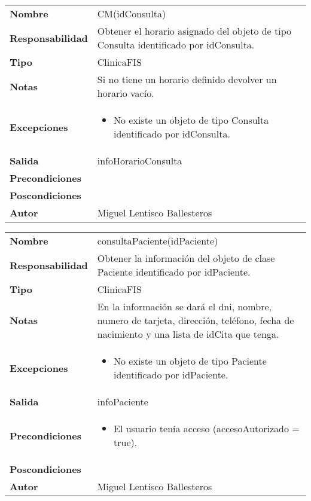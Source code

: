 \documentclass[11pt,a4paper]{article}
\newenvironment{itemizenomargins}
    {\begin{minipage}[t]{1\linewidth}\begin{itemize}}
    {\end{itemize}\end{minipage}}
\begin{document}
\begin{table}[H]
	\centering
	\label{my-label}
	\begin{tabularx}{\textwidth}{l|X}
		\textbf{Nombre}          & CM(idConsulta)\\
		\textbf{Responsabilidad} & Obtener el horario asignado del objeto de tipo Consulta identificado por idConsulta. \\
		\textbf{Tipo}            & ClinicaFIS \\
		\textbf{Notas}           &  Si no tiene un horario definido devolver un horario vacío. \\
		\textbf{Excepciones}     &  
			\begin{itemizenomargins}
				\item No existe un objeto de tipo Consulta identificado por idConsulta.
			\end{itemizenomargins}		\\
		\textbf{Salida}          &  infoHorarioConsulta \\
		\textbf{Precondiciones}  &  \\
		\textbf{Poscondiciones}  &  \\
		\textbf{Autor}			 & Miguel Lentisco Ballesteros
	\end{tabularx}
\end{table}


\begin{table}[H]
	\centering
	\label{my-label}
	\begin{tabularx}{\textwidth}{l|X}
		\textbf{Nombre}          & consultaPaciente(idPaciente)\\
		\textbf{Responsabilidad} & Obtener la información del objeto de clase Paciente identificado por idPaciente. \\
		\textbf{Tipo}            & ClinicaFIS \\
		\textbf{Notas}           &  En la información se dará el dni, nombre, numero de tarjeta, dirección, teléfono, fecha de nacimiento y una lista de idCita que tenga. \\
		\textbf{Excepciones}     &  
			\begin{itemizenomargins}
				\item No existe un objeto de tipo Paciente identificado por idPaciente.
			\end{itemizenomargins}		\\
		\textbf{Salida}          &  infoPaciente \\
		\textbf{Precondiciones}  &  
			\begin{itemizenomargins}
				\item El usuario tenía acceso (accesoAutorizado = true).
			\end{itemizenomargins} \\
		\textbf{Poscondiciones}  &  \\
		\textbf{Autor}			 & Miguel Lentisco Ballesteros
	\end{tabularx}
\end{table}
\end{document}
